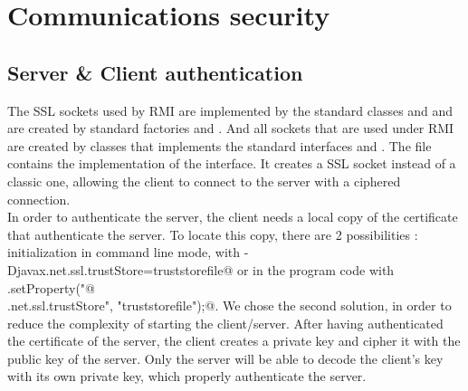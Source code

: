 \documentclass{article}
\begin{document}
\newpage


\section{Communications security}
\subsection{Server \& Client authentication}
The SSL sockets used by RMI are implemented by the standard classes \verb@SSLSocket@ and \verb@SSLSocketServer@ and are created by standard factories \verb@SSLSocketFactory@ and \verb@SSLSocketServerFactory@. And all sockets that are used under RMI are created by classes that implements the standard interfaces \verb@RMIClientSocketFactory@ and \verb@RMIServerSocketFactory@. The file \verb@RMISSLClientSocketFactory@ contains the implementation of the \verb@RMIClientSocketFactory@ interface. It creates a SSL socket instead of a classic one, allowing the client to connect to the server with a ciphered connection. \\

In order to authenticate the server, the client needs a local copy of the certificate that authenticate the server. To locate this copy, there are 2 possibilities : initialization in command line mode, with \verb@-Djavax.net.ssl.trustStore=truststorefile@ or in the program code with \verb@System.setProperty("@\\\verb@javax.net.ssl.trustStore", "truststorefile");@. We chose the second solution, in order to reduce the complexity of starting the client/server. After having authenticated the certificate of the server, the client creates a private key and cipher it with the public key of the server. Only the server will be able to decode the client's key with its own private key, which properly authenticate the server.\\
\end{document}
